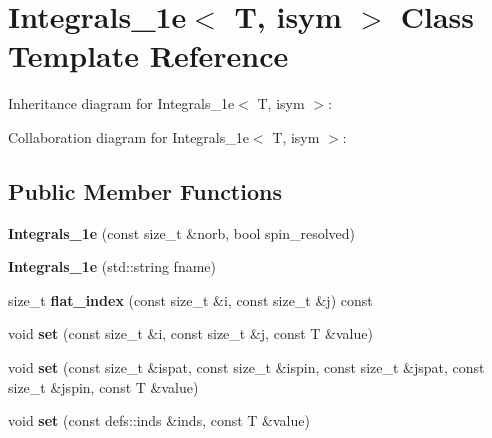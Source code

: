 \hypertarget{classIntegrals__1e}{}\section{Integrals\+\_\+1e$<$ T, isym $>$ Class Template Reference}
\label{classIntegrals__1e}


Inheritance diagram for Integrals\+\_\+1e$<$ T, isym $>$\+:


Collaboration diagram for Integrals\+\_\+1e$<$ T, isym $>$\+:
\subsection*{Public Member Functions}
\begin{DoxyCompactItemize}
\item 
{\bfseries Integrals\+\_\+1e} (const size\+\_\+t \&norb, bool spin\+\_\+resolved)\hypertarget{classIntegrals__1e_a639a4a9f4b1688a96e1d021ad7e38b66}{}\label{classIntegrals__1e_a639a4a9f4b1688a96e1d021ad7e38b66}

\item 
{\bfseries Integrals\+\_\+1e} (std\+::string fname)\hypertarget{classIntegrals__1e_af0f4537e1f148e5c2dbbfc5f252b21a5}{}\label{classIntegrals__1e_af0f4537e1f148e5c2dbbfc5f252b21a5}

\item 
size\+\_\+t {\bfseries flat\+\_\+index} (const size\+\_\+t \&i, const size\+\_\+t \&j) const \hypertarget{classIntegrals__1e_a76f25fd3451dda2ab8c66b7839bc5eb2}{}\label{classIntegrals__1e_a76f25fd3451dda2ab8c66b7839bc5eb2}

\item 
void {\bfseries set} (const size\+\_\+t \&i, const size\+\_\+t \&j, const T \&value)\hypertarget{classIntegrals__1e_a1ef9a0dc53b16eecbe5a0a35cf0a1b90}{}\label{classIntegrals__1e_a1ef9a0dc53b16eecbe5a0a35cf0a1b90}

\item 
void {\bfseries set} (const size\+\_\+t \&ispat, const size\+\_\+t \&ispin, const size\+\_\+t \&jspat, const size\+\_\+t \&jspin, const T \&value)\hypertarget{classIntegrals__1e_a8d84726e57e8b5e9ad5d2b6da38511df}{}\label{classIntegrals__1e_a8d84726e57e8b5e9ad5d2b6da38511df}

\item 
void {\bfseries set} (const defs\+::inds \&inds, const T \&value)\hypertarget{classIntegrals__1e_a29cd675e2ba1b60e45e6190c633d426f}{}\label{classIntegrals__1e_a29cd675e2ba1b60e45e6190c633d426f}


\end{DoxyCompactItemize}
